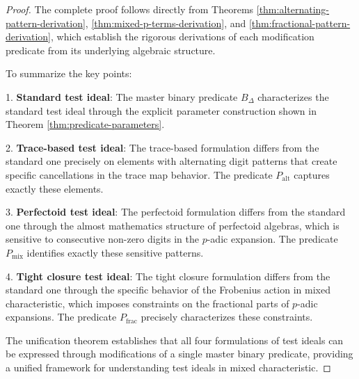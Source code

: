 \begin{proof}
The complete proof follows directly from Theorems \ref{thm:alternating-pattern-derivation}, \ref{thm:mixed-p-terms-derivation}, and \ref{thm:fractional-pattern-derivation}, which establish the rigorous derivations of each modification predicate from its underlying algebraic structure.

To summarize the key points:

1. \textbf{Standard test ideal}: The master binary predicate $B_\Delta$ characterizes the standard test ideal through the explicit parameter construction shown in Theorem \ref{thm:predicate-parameters}.

2. \textbf{Trace-based test ideal}: The trace-based formulation differs from the standard one precisely on elements with alternating digit patterns that create specific cancellations in the trace map behavior. The predicate $P_{\text{alt}}$ captures exactly these elements.

3. \textbf{Perfectoid test ideal}: The perfectoid formulation differs from the standard one through the almost mathematics structure of perfectoid algebras, which is sensitive to consecutive non-zero digits in the $p$-adic expansion. The predicate $P_{\text{mix}}$ identifies exactly these sensitive patterns.

4. \textbf{Tight closure test ideal}: The tight closure formulation differs from the standard one through the specific behavior of the Frobenius action in mixed characteristic, which imposes constraints on the fractional parts of $p$-adic expansions. The predicate $P_{\text{frac}}$ precisely characterizes these constraints.

The unification theorem establishes that all four formulations of test ideals can be expressed through modifications of a single master binary predicate, providing a unified framework for understanding test ideals in mixed characteristic.
\end{proof} 
